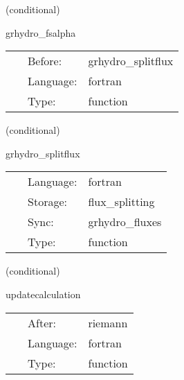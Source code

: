 \documentclass{article}
\begin{document}
\vspace{5mm}

   (conditional) 

\hspace{5mm} grhydro\_fsalpha 

\hspace{5mm}{\it compute the maximum characteristic speeds } 


\hspace{5mm}

 \begin{tabular*}{160mm}{cll} 
~ & Before:  & grhydro\_splitflux \\ 
~ & Language:  & fortran \\ 
~ & Type:  & function \\ 
\end{tabular*} 


\vspace{5mm}

   (conditional) 

\hspace{5mm} grhydro\_splitflux 

\hspace{5mm}{\it compute the fluxes using weno5 fd + lax-friedrichs splitting } 


\hspace{5mm}

 \begin{tabular*}{160mm}{cll} 
~ & Language:  & fortran \\ 
~ & Storage:  & flux\_splitting \\ 
~ & Sync:  & grhydro\_fluxes \\ 
~ & Type:  & function \\ 
\end{tabular*} 


\vspace{5mm}

   (conditional) 

\hspace{5mm} updatecalculation 

\hspace{5mm}{\it calculate the update term from the fluxes } 


\hspace{5mm}

 \begin{tabular*}{160mm}{cll} 
~ & After:  & riemann \\ 
~ & Language:  & fortran \\ 
~ & Type:  & function \\ 
\end{tabular*} 
\end{document}
